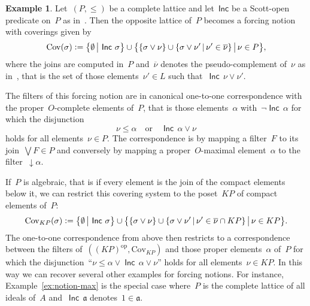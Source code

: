 \documentclass[com,11pt,crcready]{iosart2x}
\theoremstyle{definition}
\newtheorem{example}[definition]{Example}
\theoremstyle{plain}
\theoremstyle{remark}
\newcommand{\Incbare}{\mathsf{Inc}}
\newcommand{\Inc}[1]{\operatorname{\Incbare}\,#1}
\newcommand{\?}{\,{:}\,}
\newcommand{\aaa}{\mathfrak{a}}
\newcommand{\defeq}{\vcentcolon=}
\newcommand{\Cov}{\mathrm{Cov}}
\renewcommand{\_}{\mathpunct{.}\,}
\begin{document}
\begin{example}\label{ex:notion-scott}Let~$(P,{\leq})$ be a complete lattice and let~$\Incbare$
be a Scott-open predicate on~$P$ as in~\cite{wessel-schuster:radical}. Then the
opposite lattice of~$P$ becomes a forcing notion with coverings given by
\[
  \Cov(\sigma) \defeq \bigl\{ \emptyset \,\big|\, \Inc{\sigma} \bigr\} \cup
    \bigl\{ \{ \sigma \vee \nu \} \cup \{ \sigma \vee \nu' \,|\, \nu' \in
    \overline{\nu} \} \,\big|\, \nu \in P \bigr\},
\]
where the joins are computed in~$P$ and~$\overline{\nu}$ denotes the pseudo-complement of~$\nu$ as
in~\cite[Equation~(6)]{wessel-schuster:radical}, that is the set of those
elements~$\nu' \in L$ such that~$\Inc{\nu \vee \nu'}$.

The filters of this forcing notion are in canonical one-to-one correspondence with
the proper~$O$-complete elements of~$P$, that is those elements~$\alpha$
with~$\neg \Inc{\alpha}$ for which the disjunction
\[ \nu \leq \alpha \quad\text{or}\quad \Inc{\alpha \vee \nu} \]
holds for all elements~$\nu \in P$. The correspondence is by mapping a
filter~$F$ to its join~$\bigvee F \in P$ and conversely by mapping
a proper~$O$-maximal element~$\alpha$ to the filter~${\downarrow}\alpha$.

If~$P$ is algebraic, that is if every element is the join of the compact
elements below it, we can restrict this covering system to the poset~$KP$ of
compact elements of~$P$:
\[
  \Cov_{KP}(\sigma) \defeq \bigl\{ \emptyset \,\big|\, \Inc{\sigma} \bigr\} \cup
    \bigl\{ \{ \sigma \vee \nu \} \cup \{ \sigma \vee \nu' \,|\, \nu' \in
    \overline{\nu} \cap KP \} \,\big|\, \nu \in KP \bigr\}.
\]
The one-to-one correspondence from above then restricts to a correspondence
between the filters of~$((KP)^\mathrm{op},\mathrm{Cov}_{KP})$ and those proper
elements~$\alpha$ of~$P$ for which the disjunction~``$\nu \leq \alpha \vee
\Inc{\alpha \vee \nu}$'' holds for all elements~$\nu \in KP$. In this way we can
recover several other examples for forcing notions. For instance,
Example~\ref{ex:notion-max} is the special case where~$P$ is the complete lattice
of all ideals of~$A$ and~$\Inc{\aaa}$ denotes~$1 \in \aaa$.
\end{example}
\end{document}
